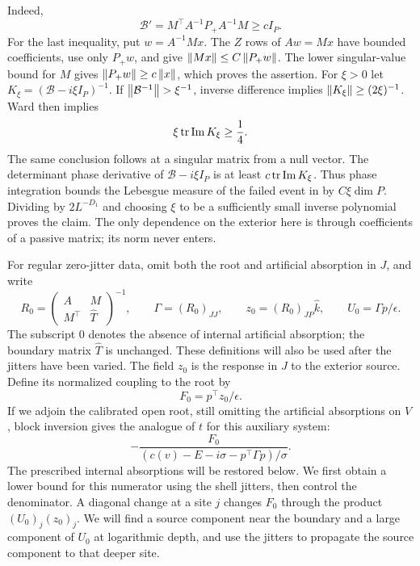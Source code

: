 Indeed,
\[
 \mathcal B'=M^\top A^{-1}P_+A^{-1}M\ge cI_P.
\]
For the last inequality, put $w=A^{-1}Mx$. The $Z$ rows of $Aw=Mx$
have bounded coefficients, use only $P_+w$, and give
$\left\lVert Mx\right\rVert\le C\left\lVert P_+w\right\rVert$. The lower singular-value bound for
$M$ gives $\left\lVert P_+w\right\rVert\ge c\left\lVert x\right\rVert$, which proves the assertion.
For $\xi>0$ let $K_\xi=(\mathcal B-i\xi I_P)^{-1}$. If
$\left\lVert\mathcal B^{-1}\right\rVert>\xi^{-1}$, inverse difference implies
$\left\lVert K_\xi\right\rVert\ge(2\xi)^{-1}$. Ward then implies
\begin{equation}
 \xi\operatorname{tr}\operatorname{Im}K_\xi\ge\frac14.
 \label{trans:regular-test}
\end{equation}
The same conclusion follows at a singular matrix from a null vector.
The determinant phase derivative of $\mathcal B-i\xi I_P$ is at least
$c\operatorname{tr}\operatorname{Im}K_\xi$. Thus phase integration bounds the
Lebesgue measure of the failed event in  by
$C\xi\dim P$. Dividing by $2L^{-D_1}$ and choosing $\xi$ to be a
sufficiently small inverse polynomial proves the claim. The only
dependence on the exterior here is through coefficients of a passive
matrix; its norm never enters.

For regular zero-jitter data, omit both the root and artificial
absorption in $J$, and write
\begin{equation}
 R_0=\begin{pmatrix}A&M\\M^\top&\widehat T\end{pmatrix}^{-1},
 \qquad \Gamma=(R_0)_{JJ},\qquad
 z_0=(R_0)_{JP}\widehat k,\qquad
 U_0=\Gamma p/\epsilon.
 \label{trans:rootless-fields}
\end{equation}
The subscript $0$ denotes the absence of internal artificial
absorption; the boundary matrix $\widehat T$ is unchanged. These
definitions will also be used after the jitters have been varied.
The field $z_0$ is the response in $J$ to the exterior source. Define
its normalized coupling to the root by
\[
 F_0=p^\top z_0/\epsilon.
\]
If we adjoin the calibrated open root, still omitting the artificial
absorptions on $V$, block inversion gives the analogue of $t$ for this
auxiliary system:
\[
 -\frac{F_0}{(c(v)-E-i\sigma-p^\top\Gamma p)/\sigma}.
\]
The prescribed internal absorptions will be restored below.
We first obtain a lower bound for this numerator using
the shell jitters, then control the denominator. A diagonal change at
a site $j$ changes $F_0$ through the product $(U_0)_j(z_0)_j$.
We will find a source component near the boundary and a large component
of $U_0$ at logarithmic depth, and use the jitters to propagate the
source component to that deeper site.

